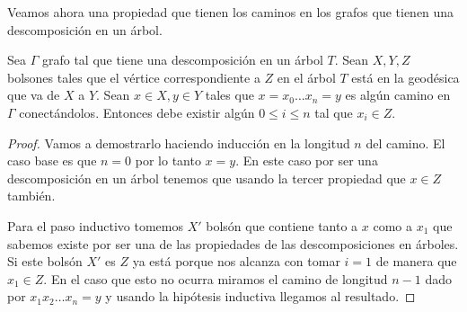 \documentclass[tesis.tex]{subfiles}
\begin{document}
Veamos ahora una propiedad que tienen los caminos en los grafos que tienen una descomposición en un árbol.

\begin{prop}\label{prop-camino-desc}
	Sea $\Gamma$ grafo tal que tiene una descomposición en un árbol $T$.
	Sean $X,Y,Z$ bolsones tales que el vértice correspondiente a $Z$ en el árbol $T$ está en la geodésica que va de $X$ a $Y$. 
	Sean $x \in X, y \in Y$ tales que $x = x_0 \dots x_n=y$ es algún camino en $\Gamma$ conectándolos.
	Entonces debe existir algún $ 0 \le i \le n$ tal que $x_i \in Z$. 
\end{prop}

\begin{proof}	
	Vamos a demostrarlo haciendo inducción en la longitud $n$ del camino. 
	El caso base es que $n = 0$ por lo tanto $x=y$. 
	En este caso por ser una descomposición en un árbol tenemos que usando la tercer propiedad que $x \in Z$ también.
	
	Para el paso inductivo tomemos $X'$ bolsón que contiene tanto a $x$ como a $x_1$ que sabemos existe por ser una de las propiedades de las descomposiciones en árboles.
	Si este bolsón $X'$ es $Z$ ya está porque nos alcanza con tomar $i=1$ de manera que $x_1 \in Z$.
	En el caso que esto no ocurra miramos el camino de longitud $n-1$ dado por $x_1 x_2 \dots x_n = y$ y usando la hipótesis inductiva llegamos al resultado.	
\end{proof}
\end{document}
